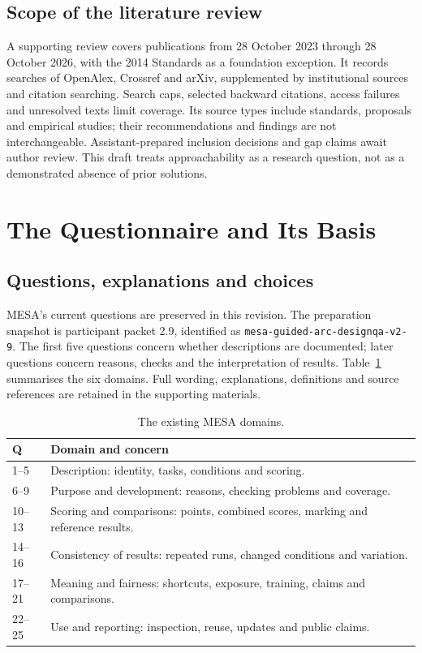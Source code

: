 \documentclass[10pt,conference]{IEEEtran}
\begin{document}
\subsection{Scope of the literature review}
A supporting review covers publications from 28 October 2023 through 28 October 2026, with the 2014 Standards as a foundation exception. It records searches of OpenAlex, Crossref and arXiv, supplemented by institutional sources and citation searching. Search caps, selected backward citations, access failures and unresolved texts limit coverage. Its source types include standards, proposals and empirical studies; their recommendations and findings are not interchangeable. Assistant-prepared inclusion decisions and gap claims await author review. This draft treats approachability as a research question, not as a demonstrated absence of prior solutions.

\section{The Questionnaire and Its Basis}
\subsection{Questions, explanations and choices}
MESA's current questions are preserved in this revision. The preparation snapshot is participant packet 2.9, identified as \texttt{mesa-guided-arc-designqa-v2-9}. The first five questions concern whether descriptions are documented; later questions concern reasons, checks and the interpretation of results. Table~\ref{tab:domains} summarises the six domains. Full wording, explanations, definitions and source references are retained in the supporting materials.

\begin{table}[t]
\caption{The existing MESA domains.}
\label{tab:domains}
\small
\begin{tabularx}{\columnwidth}{@{}p{}X@{}}
\toprule
Q & Domain and concern \\
\midrule
1--5 & Description: identity, tasks, conditions and scoring. \\
6--9 & Purpose and development: reasons, checking problems and coverage. \\
10--13 & Scoring and comparisons: points, combined scores, marking and reference results. \\
14--16 & Consistency of results: repeated runs, changed conditions and variation. \\
17--21 & Meaning and fairness: shortcuts, exposure, training, claims and comparisons. \\
22--25 & Use and reporting: inspection, reuse, updates and public claims. \\
\bottomrule
\end{tabularx}
\end{table}
\end{document}
